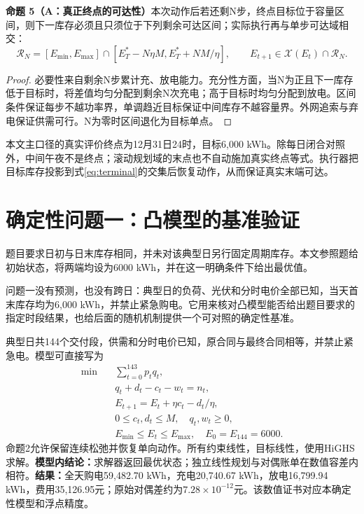 \documentclass[UTF8,a4paper,zihao=-4,fontset=mac]{ctexart}
\newcommand{\pp}[2]{\par\noindent\textbf{命题 #1（#2）}\quad}
\begin{document}
\pp{5}{A：真正终点的可达性}本次动作后若还剩N步，终点目标位于容量区间，则下一库存必须且只须位于下列剩余可达区间；实际执行再与单步可达域相交：
\begin{equation}\label{eq:terminal}
 \mathcal R_N=[E_{\min},E_{\max}]\cap[E_T^*-N\eta M,E_T^*+NM/\eta],\qquad
 E_{t+1}\in\mathcal X(E_t)\cap\mathcal R_N.
\end{equation}
\begin{proof}
必要性来自剩余N步累计充、放电能力。充分性方面，当N为正且下一库存低于目标时，将差值均匀分配到剩余N次充电；高于目标时均匀分配到放电。区间条件保证每步不越功率界，单调趋近目标保证中间库存不越容量界。外网追索与弃电保证供需可行。N为零时区间退化为目标单点。
\end{proof}
本文主口径的真实评价终点为12月31日24时，目标6,000 kWh。除每日闭合对照外，中间午夜不是终点；滚动规划域的末点也不自动施加真实终点等式。执行器把目标库存投影到式\eqref{eq:terminal}的交集后恢复动作，从而保证真实末端可达。

\section{确定性问题一：凸模型的基准验证}
题目要求日初与日末库存相同，并未对该典型日另行固定周期库存。本文参照题给初始状态，将两端均设为6000 kWh，并在这一明确条件下给出最优值。

问题一没有预测，也没有跨日：典型日的负荷、光伏和分时电价全部已知，当天首末库存均为6,000 kWh，并禁止紧急购电。它用来核对凸模型能否给出题目要求的指定时段结果，也给后面的随机机制提供一个可对照的确定性基准。

典型日共144个交付段，供需和分时电价已知，原合同与最终合同相等，并禁止紧急电。模型可直接写为
\begin{equation}\label{eq:q1}
\begin{aligned}
 \min\quad &\sum_{t=0}^{143}p_tq_t,\\
 &q_t+d_t-c_t-w_t=n_t,\\
 &E_{t+1}=E_t+\eta c_t-d_t/\eta,\\
 &0\le c_t,d_t\le M,\quad q_t,w_t\ge0,\\
 &E_{\min}\le E_t\le E_{\max},\quad E_0=E_{144}=6000.
\end{aligned}
\end{equation}
命题2允许保留连续松弛并恢复单向动作。所有约束线性，目标线性，使用HiGHS求解\cite{highs}。\textbf{模型内结论：}求解器返回最优状态；独立线性规划与对偶账单在数值容差内相符。\textbf{结果：}全天购电59,482.70 kWh，充电20,740.67 kWh，放电16,799.94 kWh，费用35,126.95元；原始对偶差约为$7.28\times10^{-12}$元。该数值证书对应本确定性模型和浮点精度。


\end{document}
